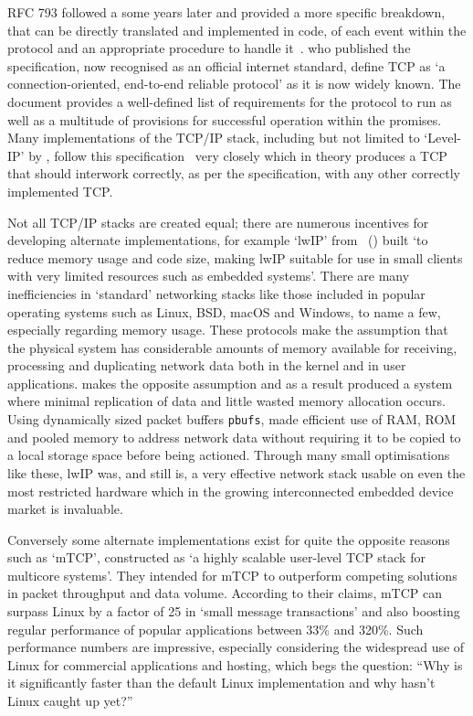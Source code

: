 \documentclass[11pt,a4paper,british]{bhamarticle}
\begin{document}
RFC 793 followed a some years later and provided a more specific breakdown, that can be directly translated and implemented in code, of each event within the protocol and an appropriate procedure to handle it~\cite[Page~54-77]{rfc793}. \citeauthor{rfc793} who published the specification, now recognised as an official internet standard, define TCP as `a connection-oriented, end-to-end reliable protocol' as it is now widely known. The document provides a well-defined list of requirements for the protocol to run as well as a multitude of provisions for successful operation within the promises.
Many implementations of the TCP/IP stack, including but not limited to `Level-IP' by \citeauthor{levelip-spec}, follow this specification~\cite[\texttt{src/tcp\_input.c} line~262]{levelip-spec} very closely which in theory produces a TCP that should interwork correctly, as per the specification, with any other correctly implemented TCP. %

Not all TCP/IP stacks are created equal; there are numerous incentives for developing alternate implementations, for example `lwIP' from \citeauthor{lwip}~(\citeyear{lwip}) built `to reduce memory usage and code size, making lwIP suitable for use in small clients with very limited resources such as embedded systems'. There are many inefficiencies in `standard' networking stacks like those included in popular operating systems such as Linux, BSD, macOS and Windows, to name a few, especially regarding memory usage. These protocols make the assumption that the physical system has considerable amounts of memory available for receiving, processing and duplicating network data both in the kernel and in user applications. \citeauthor{lwip} makes the opposite assumption and as a result produced a system where minimal replication of data and little wasted memory allocation occurs. Using dynamically sized packet buffers \texttt{pbufs}, \citeauthor{lwip} made efficient use of RAM, ROM and pooled memory to address network data without requiring it to be copied to a local storage space before being actioned. Through many small optimisations like these, lwIP was, and still is, a very effective network stack usable on even the most restricted hardware which in the growing interconnected embedded device market is invaluable.

Conversely some alternate implementations exist for quite the opposite reasons such as `mTCP', \citeauthor{jeong2014mtcp} constructed as `a highly scalable user-level TCP stack for multicore systems'. They intended for mTCP to outperform competing solutions in packet throughput and data volume. According to their claims, mTCP can surpass Linux by a factor of 25 in `small message transactions' and also boosting regular performance of popular applications between 33\% and 320\%. Such performance numbers are impressive, especially considering the widespread use of Linux for commercial applications and hosting, which begs the question: ``Why is it significantly faster than the default Linux implementation and why hasn't Linux caught up yet?''~\cite[2.2, 3]{jeong2014mtcp}
\end{document}
